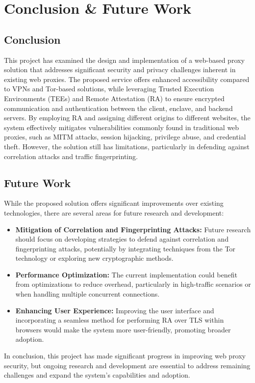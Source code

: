 \chapter{Conclusion \& Future Work}\label{ch:sample-chapter}
\section{Conclusion}
This project has examined the design and implementation of a web-based proxy solution that addresses significant security and privacy challenges inherent in existing web proxies. The proposed service offers enhanced accessibility compared to VPNs and Tor-based solutions, while leveraging Trusted Execution Environments (TEEs) and Remote Attestation (RA) to ensure encrypted communication and authentication between the client, enclave, and backend servers. By employing RA and assigning different origins to different websites, the system effectively mitigates vulnerabilities commonly found in traditional web proxies, such as MITM attacks, session hijacking, privilege abuse, and credential theft. However, the solution still has limitations, particularly in defending against correlation attacks and traffic fingerprinting.

\section{Future Work}
While the proposed solution offers significant improvements over existing technologies, there are several areas for future research and development:
\begin{itemize}
    \item \textbf{Mitigation of Correlation and Fingerprinting Attacks:} Future research should focus on developing strategies to defend against correlation and fingerprinting attacks, potentially by integrating techniques from the Tor technology or exploring new cryptographic methods.
    \item \textbf{Performance Optimization:} The current implementation could benefit from optimizations to reduce overhead, particularly in high-traffic scenarios or when handling multiple concurrent connections.
    \item \textbf{Enhancing User Experience:} Improving the user interface and incorporating a seamless method for performing RA over TLS within browsers would make the system more user-friendly, promoting broader adoption.
\end{itemize}

In conclusion, this project has made significant progress in improving web proxy security, but ongoing research and development are essential to address remaining challenges and expand the system's capabilities and adoption.